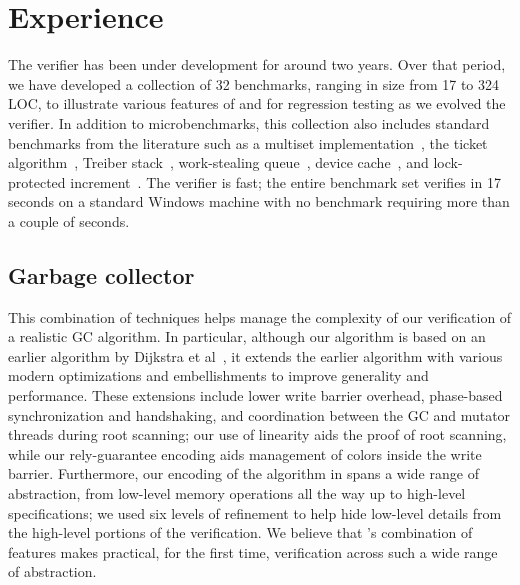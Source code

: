 \section{Experience}
\label{sec:experience}

The \civl verifier has been under development for around two years.  
Over that period, we have developed a collection of 32 benchmarks, 
ranging in size from 17 to 324 LOC, to illustrate various features of
\civl and for regression testing as we evolved the verifier.
In addition to microbenchmarks, this collection also includes
standard benchmarks from the literature such as a multiset implementation~\cite{ElmasTQ05}, 
the ticket algorithm~\cite{FarzanKP14}, 
Treiber stack~\cite{Herlihy2008}, work-stealing queue~\cite{Blumofe1999},
device cache~\cite{ElmasQT09}, and lock-protected increment~\cite{FlanaganQ03}. 
The \civl verifier is fast; the entire benchmark set verifies in 17 seconds on a standard Windows machine with no benchmark 
requiring more than a couple of seconds.

\subsection{Garbage collector}
This combination of techniques helps manage the complexity of our verification of a realistic GC algorithm.  
In particular, although our algorithm is based on an earlier algorithm by Dijkstra et al~\cite{dijk78}, 
it extends the earlier algorithm with various modern optimizations and embellishments to improve generality and performance.  
These extensions include lower write barrier overhead, phase-based synchronization and handshaking, 
and coordination between the GC and mutator threads during root scanning; our use of linearity aids the proof of root scanning, 
while our rely-guarantee encoding aids management of colors inside the write barrier.  
Furthermore, our encoding of the algorithm in \civl spans a wide range of abstraction, 
from low-level memory operations all the way up to high-level specifications; 
we used six levels of refinement to help hide low-level details from the high-level portions of the verification.
We believe that \civl's combination of features makes practical, for the first time, verification across such a wide range of abstraction.


